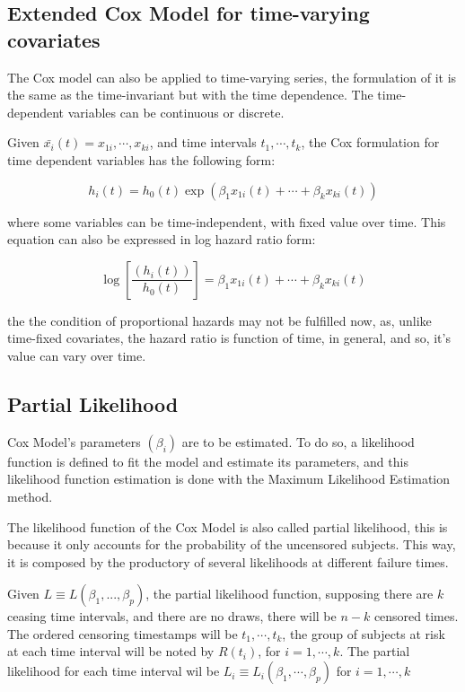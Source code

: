 \documentclass[11pt]{book} %
\begin{document}
    \subsection{Extended Cox Model for time-varying covariates}

      The Cox model can also be applied to time-varying series, the formulation of it is the same as the time-invariant but with the time dependence. The time-dependent variables can be continuous or discrete.

      Given $\bar{x_i}(t) = x_{1i},\cdots,x_{ki}$, and time intervals $t_1,\cdots,t_k$, the Cox formulation for time dependent variables has the following form:

      \begin{equation}
        h_i(t) = h_0(t)\exp(\beta_1x_{1i}(t)+\cdots+\beta_kx_{ki}(t))
        \label{eq:cox-time-varying-hazard}
      \end{equation}

      where some variables can be time-independent, with fixed value over time. This equation can also be expressed in log hazard ratio form:

      \begin{equation}
        \log \left[ \frac{(h_i(t))}{h_0(t)} \right] = \beta_1x_{1i}(t) + \cdots + \beta_kx_{ki}(t)
        \label{eq:cox-time-varying-hazard-ratio}
      \end{equation}

      the the condition of proportional hazards may not be fulfilled now, as, unlike time-fixed covariates, the hazard ratio is function of time, in general, and so, it's value can vary over time.

    \subsection{Partial Likelihood}

      Cox Model's parameters $(\beta_i)$ are to be estimated. To do so, a likelihood function is defined to fit the model and estimate its parameters, and this likelihood function estimation is done with the Maximum Likelihood Estimation method.

      The likelihood function of the Cox Model is also called partial likelihood, this is because it only accounts for the probability of the uncensored subjects. This way, it is composed by the productory of several likelihoods at different failure times.

      Given $L\equiv L(\beta_1,...,\beta_p)$, the partial likelihood function, supposing there are $k$ ceasing time intervals, and there are no draws, there will be $n - k$ censored times. The ordered censoring timestamps will be $t_1, \cdots,t_k$, the group of subjects at risk at each time interval will be noted by $R(t_i)$, for $i=1,\cdots,k$. The partial likelihood for each time interval wil be $L_i\equiv L_i(\beta_1,\cdots,\beta_p)$ for $i=1,\cdots,k$
\end{document}
